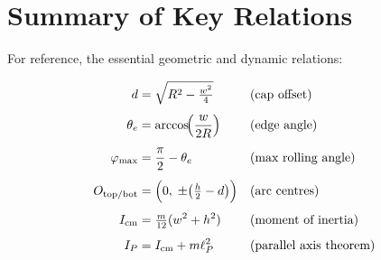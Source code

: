 \documentclass[11pt,a4paper]{article}
\newcommand{\cm}{\mathrm{cm}}
\theoremstyle{plain}
\theoremstyle{definition}
\theoremstyle{remark}
\begin{document}
\section{Summary of Key Relations}
\label{sec:summary}

For reference, the essential geometric and dynamic relations:

\begin{align}
    d &= \sqrt{R^2 - \tfrac{w^2}{4}} & &\text{(cap offset)} \label{eq:sum-d} \\[4pt]
    \theta_e &= \arccos\!\Bigl(\frac{w}{2R}\Bigr) & &\text{(edge angle)} \label{eq:sum-theta} \\[4pt]
    \varphi_{\max} &= \frac{\pi}{2} - \theta_e & &\text{(max rolling angle)} \label{eq:sum-phi} \\[4pt]
    O_{\mathrm{top/bot}} &= \Bigl(0,\;\pm\bigl(\tfrac{h}{2} - d\bigr)\Bigr) & &\text{(arc centres)} \label{eq:sum-centers} \\[4pt]
    I_{\cm} &= \tfrac{m}{12}(w^2 + h^2) & &\text{(moment of inertia)} \label{eq:sum-I} \\[4pt]
    I_P &= I_{\cm} + m\ell_P^2 & &\text{(parallel axis theorem)} \label{eq:sum-parallel}
\end{align}



% 
\end{document}
